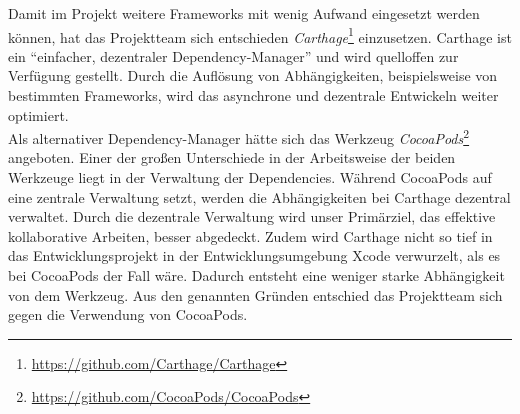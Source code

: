 Damit im Projekt weitere Frameworks mit wenig Aufwand eingesetzt werden können, hat das Projektteam sich entschieden \emph{Carthage}\footnote{\url{https://github.com/Carthage/Carthage}} einzusetzen. Carthage ist ein \enquote{einfacher, dezentraler Dependency-Manager} und wird quelloffen zur Verfügung gestellt. Durch die Auflösung von Abhängigkeiten, beispielsweise von bestimmten Frameworks, wird das asynchrone und dezentrale Entwickeln weiter optimiert. \\
Als alternativer Dependency-Manager hätte sich das Werkzeug \emph{CocoaPods}\footnote{\url{https://github.com/CocoaPods/CocoaPods}} angeboten. Einer der großen Unterschiede in der Arbeitsweise der beiden Werkzeuge liegt in der Verwaltung der Dependencies. Während CocoaPods auf eine zentrale Verwaltung setzt, werden die Abhängigkeiten bei Carthage dezentral verwaltet. Durch die dezentrale Verwaltung wird unser Primärziel, das effektive kollaborative Arbeiten, besser abgedeckt. Zudem wird Carthage nicht so tief in das Entwicklungsprojekt in der Entwicklungsumgebung Xcode verwurzelt, als es bei CocoaPods der Fall wäre. Dadurch entsteht eine weniger starke Abhängigkeit von dem Werkzeug. Aus den genannten Gründen entschied das Projektteam sich gegen die Verwendung von CocoaPods. 








